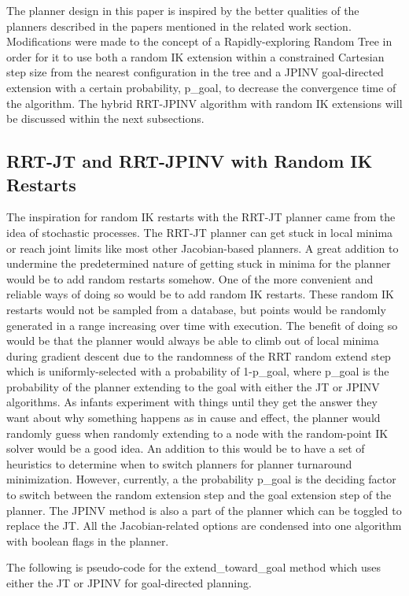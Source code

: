 \documentclass[conference]{IEEEtran} \usepackage[T1]{fontenc} \usepackage[backend=biber, style=ieee]{biblatex}
\begin{document}
The planner design in this paper is inspired by the better qualities of the planners described in the papers mentioned in the related work section. Modifications were made to the 
concept of a Rapidly-exploring Random Tree in order for it to use both a random IK extension within a constrained Cartesian step size from the nearest configuration in the tree and 
a JPINV goal-directed extension with a certain probability, p\_goal, to decrease the convergence time of the algorithm. The hybrid RRT-JPINV algorithm with random IK extensions
will be discussed within the next subsections.

\subsection{RRT-JT and RRT-JPINV with Random IK Restarts}

The inspiration for random IK restarts with the RRT-JT planner came from the idea of stochastic processes. The RRT-JT planner can get stuck in local minima or reach joint
limits like most other Jacobian-based planners. A great addition to undermine the predetermined nature of getting stuck in minima for the planner would be to add random
restarts somehow. One of the more convenient and reliable ways of doing so would be to add random IK restarts. These random IK restarts would not be sampled from a database,
but points would be randomly generated in a range increasing over time with execution. The benefit of doing so would be that the planner would always be able to climb out of local
minima during gradient descent due to the randomness of the RRT random extend step which is uniformly-selected with a probability of 1-p\_goal, where p\_goal is the probability 
of the planner extending to the goal with either the JT or JPINV algorithms. As infants experiment with things until they get the answer they
want about why something happens as in cause and effect, the planner would randomly guess when randomly extending to a node with the random-point IK solver would be a good idea.
An addition to this would be to have a set of heuristics to determine when to switch planners for planner turnaround minimization. However, currently, a the probability
p\_goal is the deciding factor to switch between the random extension step and the goal extension step of the planner. The JPINV method is also a part of the planner which
can be toggled to replace the JT. All the Jacobian-related options are condensed into one algorithm with boolean flags in the planner.

The following is pseudo-code for the extend\_toward\_goal method which uses either the JT or JPINV for goal-directed planning.
\end{document}
